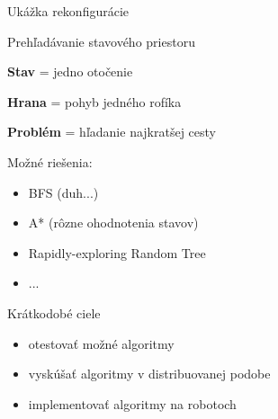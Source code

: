\documentclass{beamer}
\begin{document}
\begin{frame}{Ukážka rekonfigurácie}
\begin{center}
\end{center}
\end{frame}

\begin{frame}{Prehľadávanie stavového priestoru}

\textbf{Stav} = jedno otočenie

\textbf{Hrana} = pohyb jedného rofíka

\textbf{Problém} = hľadanie najkratšej cesty

\pause

\vspace{1em}

Možné riešenia:
\begin{itemize}
  \item BFS (duh...)
  \item A* (rôzne ohodnotenia stavov)
  \item Rapidly-exploring Random Tree
  \item ...
\end{itemize}

\end{frame}

\begin{frame}{Krátkodobé ciele}
\begin{itemize}
    \item otestovať možné algoritmy \pause
    \vspace{2em}
    \item vyskúšať algoritmy v distribuovanej podobe \pause
    \vspace{2em}
    \item implementovať algoritmy na robotoch
  \end{itemize}
\end{frame}
\end{document}
